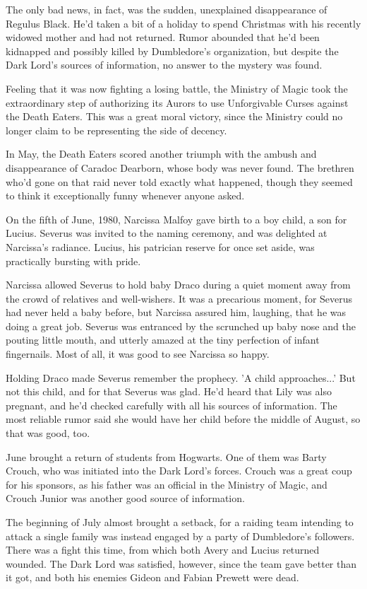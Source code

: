 \documentclass[a4paper,11pt]{article}
\begin{document}
The only bad news, in fact, was the sudden, unexplained disappearance of Regulus Black. He'd taken a bit of a holiday to spend Christmas with his recently widowed mother and had not returned. Rumor abounded that he'd been kidnapped and possibly killed by Dumbledore's organization, but despite the Dark Lord's sources of information, no answer to the mystery was found.

Feeling that it was now fighting a losing battle, the Ministry of Magic took the extraordinary step of authorizing its Aurors to use Unforgivable Curses against the Death Eaters. This was a great moral victory, since the Ministry could no longer claim to be representing the side of decency.

In May, the Death Eaters scored another triumph with the ambush and disappearance of Caradoc Dearborn, whose body was never found. The brethren who'd gone on that raid never told exactly what happened, though they seemed to think it exceptionally funny whenever anyone asked.

On the fifth of June, 1980, Narcissa Malfoy gave birth to a boy child, a son for Lucius. Severus was invited to the naming ceremony, and was delighted at Narcissa's radiance. Lucius, his patrician reserve for once set aside, was practically bursting with pride.

Narcissa allowed Severus to hold baby Draco during a quiet moment away from the crowd of relatives and well-wishers. It was a precarious moment, for Severus had never held a baby before, but Narcissa assured him, laughing, that he was doing a great job. Severus was entranced by the scrunched up baby nose and the pouting little mouth, and utterly amazed at the tiny perfection of infant fingernails. Most of all, it was good to see Narcissa so happy.

Holding Draco made Severus remember the prophecy. 'A child approaches...' But not this child, and for that Severus was glad. He'd heard that Lily was also pregnant, and he'd checked carefully with all his sources of information. The most reliable rumor said she would have her child before the middle of August, so that was good, too.

June brought a return of students from Hogwarts. One of them was Barty Crouch, who was initiated into the Dark Lord's forces. Crouch was a great coup for his sponsors, as his father was an official in the Ministry of Magic, and Crouch Junior was another good source of information.

The beginning of July almost brought a setback, for a raiding team intending to attack a single family was instead engaged by a party of Dumbledore's followers. There was a fight this time, from which both Avery and Lucius returned wounded. The Dark Lord was satisfied, however, since the team gave better than it got, and both his enemies Gideon and Fabian Prewett were dead.
\end{document}

